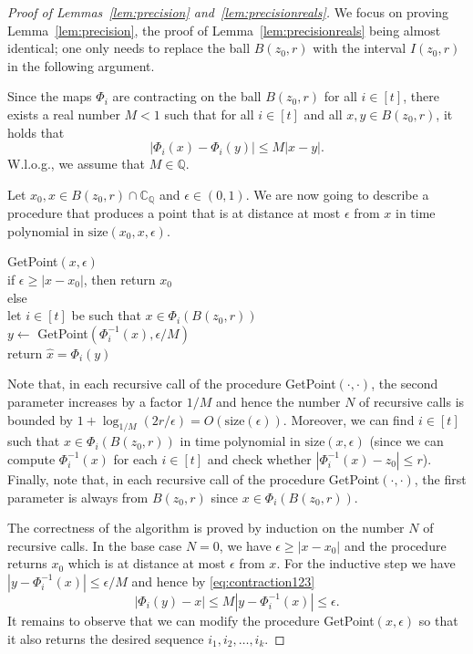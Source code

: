 \documentclass[11pt]{article}
\def\CQ{\mathbb{C}_{\mathbb{Q}}}
\newcommand{\size}[1]{\mathrm{size}(#1)}
\newcommand{\eps}{\epsilon}
\begin{document}
\begin{proof}[Proof of Lemmas~\ref{lem:precision} and~\ref{lem:precisionreals}]
We focus on proving Lemma~\ref{lem:precision}, the proof of Lemma~\ref{lem:precisionreals} being almost identical; one only needs to replace the ball $B(z_0,r)$ with the interval $I(z_0,r)$ in the following argument.


Since the maps $\Phi_i$ are contracting on the ball $B(z_0,r)$ for all $i\in [t]$, there exists a  real number $M<1$ such that for all $i\in[t]$ and all $x,y\in B(z_0,r)$, it  holds that
\begin{equation}\label{eq:contraction123}
|\Phi_i(x)-\Phi_i(y)|\leq M|x-y|.
\end{equation}
W.l.o.g., we assume that $M\in \mathbb{Q}$. 


Let $x_0,x\in B(z_0,r)\cap \CQ$ and $\epsilon\in (0,1)$. We are now going to describe a procedure that produces a point that is at distance at most $\eps$ from $x$ in time polynomial in $\size{x_0,x,\eps}$.

\phantom{AA} GetPoint$(x,\epsilon)$\\
\phantom{AAAA} if $\eps\geq |x-x_0|$, then return $x_0$\\
\phantom{AAAA} else\\
\phantom{AAAAAA} let $i\in[t]$ be such that $x\in \Phi_i(B(z_0,r))$\\
\phantom{AAAAAA} $y\leftarrow$ GetPoint$(\Phi_i^{-1}(x), \epsilon/M)$ \\
\phantom{AAAAAA} return $\hat{x}=\Phi_i(y)$ 

\vskip 0.2cm\noindent
Note that, in each recursive call of the procedure GetPoint$(\cdot,\cdot)$, the second parameter increases by a factor $1/M$ and hence the number $N$ of recursive calls is bounded by $1+\log_{1/M} (2r/\eps)=O(\size{\eps})$. Moreover, we can find $i\in[t]$ such that $x\in \Phi_i(B(z_0,r))$ in time polynomial in $\size{x,\eps}$ (since we can compute $\Phi_i^{-1}(x)$ for each $i\in [t]$ and check whether $|\Phi_i^{-1}(x)-z_0|\leq r$). Finally, note that, in each recursive call of the procedure GetPoint$(\cdot,\cdot)$, the first parameter  is always from $B(z_0,r)$ since $x\in \Phi_i(B(z_0,r))$.

The correctness of the algorithm is proved by induction on the number $N$ of recursive calls. In the base case $N=0$, we have $\eps\geq |x-x_0|$ and the procedure returns $x_0$ which is at distance at most $\eps$ from $x$. For the inductive step
we have $|y - \Phi_i^{-1}(x)|\leq \epsilon/M$ and hence by \eqref{eq:contraction123}
\[|\Phi_i(y) - x| \leq M|y-\Phi_i^{-1}(x)|\leq \epsilon.\]
It remains to observe that we can modify the procedure GetPoint$(x,\epsilon)$ so that it also returns the desired sequence $i_1,i_2,\hdots,i_k$.
\end{proof}
\end{document}
